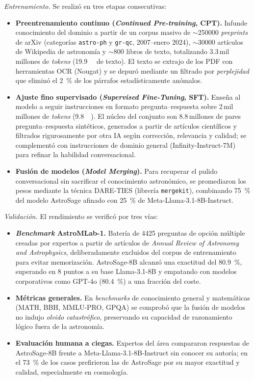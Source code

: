 \emph{Entrenamiento.} Se realizó en tres etapas consecutivas:
\begin{itemize}
  \item \textbf{Preentrenamiento continuo (\emph{Continued Pre-training}, CPT).}
  Infunde conocimiento del dominio a partir de un corpus masivo de
  $\sim$\num{250000} \emph{preprints} de arXiv (categorías \texttt{astro-ph} y
  \texttt{gr-qc}, 2007--enero 2024), $\sim$\num{30000} artículos de Wikipedia de
  astronomía y $\sim$\num{800} libros de texto, totalizando \num{3.3}\,mil
  millones de \emph{tokens} (\SI{19.9}{\giga\byte} de texto). El texto se extrajo
  de los PDF con herramientas OCR (Nougat) y se depuró mediante un filtrado por
  \emph{perplejidad} que eliminó el \SI{2}{\percent} de los párrafos
  estadísticamente anómalos.
  \item \textbf{Ajuste fino supervisado (\emph{Supervised Fine-Tuning}, SFT).}
  Enseña al modelo a seguir instrucciones en formato pregunta--respuesta sobre
  \num{2}\,mil millones de \emph{tokens} (\SI{9.8}{\giga\byte}). El núcleo del
  conjunto son \num{8.8}\,millones de pares pregunta--respuesta sintéticos,
  generados a partir de artículos científicos y filtrados rigurosamente por otra
  IA según corrección, relevancia y calidad; se complementó con instrucciones de
  dominio general (Infinity-Instruct-7M) para refinar la habilidad
  conversacional.
  \item \textbf{Fusión de modelos (\emph{Model Merging}).} Para recuperar el
  pulido conversacional sin sacrificar el conocimiento astronómico, se promediaron
  los pesos mediante la técnica DARE-TIES (librería \texttt{mergekit}),
  combinando \SI{75}{\percent} del modelo AstroSage afinado con
  \SI{25}{\percent} de Meta-Llama-3.1-8B-Instruct.
\end{itemize}

\emph{Validación.} El rendimiento se verificó por tres vías:
\begin{itemize}
  \item \textbf{\emph{Benchmark} AstroMLab-1.} Batería de \num{4425} preguntas de
  opción múltiple creadas por expertos a partir de artículos de \emph{Annual
  Review of Astronomy and Astrophysics}, deliberadamente excluidos del corpus de
  entrenamiento para evitar memorización. AstroSage-8B alcanzó una exactitud del
  \SI{80.9}{\percent}, superando en 8 puntos a su base Llama-3.1-8B y empatando con
  modelos corporativos como GPT-4o (\SI{80.4}{\percent}) a una fracción del coste.
  \item \textbf{Métricas generales.} En \emph{benchmarks} de conocimiento general y
  matemáticas (MATH, BBH, MMLU-PRO, GPQA) se comprobó que la fusión de modelos no
  indujo \emph{olvido catastrófico}, preservando su capacidad de razonamiento
  lógico fuera de la astronomía.
  \item \textbf{Evaluación humana a ciegas.} Expertos del área compararon respuestas
  de AstroSage-8B frente a Meta-Llama-3.1-8B-Instruct sin conocer su autoría; en el
  \SI{73}{\percent} de los casos prefirieron las de AstroSage por su mayor exactitud
  y calidad, especialmente en cosmología.
\end{itemize}


